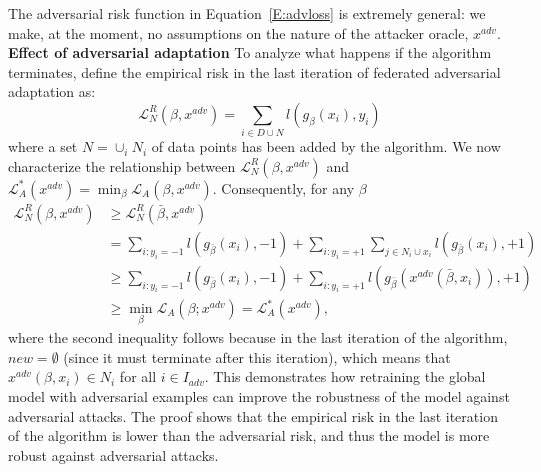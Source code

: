 The adversarial risk function in Equation~\ref{E:advloss} is extremely
general: we make, at the moment, no assumptions on the nature of the
attacker oracle, ${x^{adv}}$.
\\\textbf{Effect of adversarial adaptation}
To analyze what happens if the algorithm terminates, define the empirical risk in the last
iteration of federated adversarial adaptation as:
\begin{equation}
\label{E:radloss}
\mathcal{L}^R_N(\beta, {x^{adv}}) = \sum_{i \in D \cup N} l(g_\beta(x_i),y_i) 
\end{equation}
where a set $N = \cup_i N_i$ of data points has been added
by the algorithm.
We now characterize the relationship between $\mathcal{L}^R_N(\beta, {x^{adv}})$
and $\mathcal{L}_A^*({x^{adv}}) = \min_\beta \mathcal{L}_A(\beta,
{x^{adv}})$. Consequently, for any $\beta$ \begin{align*}
\mathcal{L}^R_N(\beta, {x^{adv}}) &\ge \mathcal{L}^R_N(\bar{\beta},
{x^{adv}})\\
&= \sum_{i: y_i = -1} l(g_{\bar{\beta}}(x_i),-1) +\sum_{i:y_i = +1} \sum_{j
  \in N_i \cup x_i} l(g_{\bar{\beta}} (x_i),+1) \\
&\ge \sum_{i: y_i = -1} l(g_{\bar{\beta}}(x_i),-1) +\sum_{i:y_i = +1}
l(g_{\bar{\beta}} ({x^{adv}}(\bar{\beta},x_i)),+1) \\
&\ge \min_\beta \mathcal{L}_A(\beta; {x^{adv}}) = \mathcal{L}_A^*({x^{adv}}),
\end{align*}
where the second inequality follows because in the last iteration of the algorithm, $new =
\emptyset$ (since it must terminate after this iteration), which means
that ${x^{adv}}(\beta,x_i) \in N_i$ for all $i \in I_{adv}$. This demonstrates how retraining the global model with adversarial examples can improve the robustness of the model against adversarial attacks. The proof shows that the  empirical risk in the last iteration of the algorithm is lower than the adversarial risk, and thus the model is more robust against adversarial attacks. 



